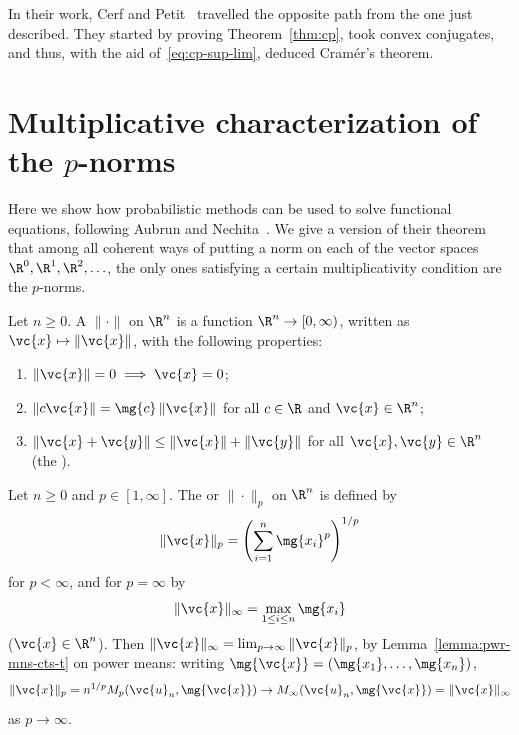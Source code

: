 \begin{remark}
In their work, Cerf%
% 
% 
and Petit~\cite{CePe}%
% 
% 
travelled the opposite path from
the one just described.  They started by proving Theorem~\ref{thm:cp},
took convex conjugates, and thus, with the aid of~\eqref{eq:cp-sup-lim}, 
deduced Cram\'er's theorem.
\end{remark}


\section{Multiplicative characterization of the $p$-norms}


Here we show how probabilistic methods can be used to solve functional
equations, following Aubrun and Nechita~\cite{AuNe}.  We give a version of
their theorem that among all coherent ways of putting a norm on each of the
vector spaces $\R^0, \R^1, \R^2, \ldots$, the only ones satisfying a
certain multiplicativity condition are the $p$-norms.

\begin{defn}
Let $n \geq 0$.  A  $\|\cdot\|$ on $\R^n$ is a function $\R^n
\to [0, \infty)$, written as $\vc{x} \mapsto \|\vc{x}\|$, with the
  following properties:
% 
\begin{enumerate}
\item 
$\|\vc{x}\| = 0 \implies \vc{x} = 0$;

\item
$\|c\vc{x}\| = \mg{c}\,\|\vc{x}\|$ for all $c \in \R$ and $\vc{x} \in \R^n$;

\item
$\|\vc{x} + \vc{y}\| \leq \|\vc{x}\| + \|\vc{y}\|$ for all $\vc{x}, \vc{y}
  \in \R^n$ (the ).
\end{enumerate}
\end{defn}

\begin{example}
% 
Let $n \geq 0$ and $p \in [1, \infty]$.  The
 or 
 $\|\cdot\|_p$ on $\R^n$ is defined by
\[
\|\vc{x}\|_p
=
\Biggl( \sum_{i = 1}^n \mg{x_i}^p \Biggr)^{1/p}
\]
for $p < \infty$, and for $p = \infty$ by
\[
\|\vc{x}\|_\infty
=
\max_{1 \leq i \leq n} \mg{x_i}
\]
($\vc{x} \in \R^n$).  Then $\|\vc{x}\|_\infty = \lim_{p \to \infty}
\|\vc{x}\|_p$, by Lemma~\ref{lemma:pwr-mns-cts-t} on power
means: writing $\mg{\vc{x}} = (\mg{x_1}, \ldots, \mg{x_n})$,
\[
\|\vc{x}\|_p
=
n^{1/p} M_p(\vc{u}_n, \mg{\vc{x}})
\to
M_\infty(\vc{u}_n, \mg{\vc{x}})
=
\|\vc{x}\|_\infty
\]
as $p \to \infty$.
\end{example}

